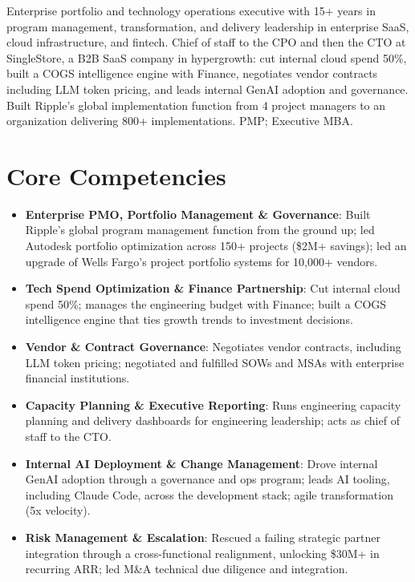 \documentclass[11pt,letterpaper,sans]{moderncv}
\begin{document}
\makecvtitle


\vspace{6pt}
\small{Enterprise portfolio and technology operations executive with 15+ years in program management, transformation, and delivery leadership in enterprise SaaS, cloud infrastructure, and fintech. Chief of staff to the CPO and then the CTO at SingleStore, a B2B SaaS company in hypergrowth: cut internal cloud spend 50\%, built a COGS intelligence engine with Finance, negotiates vendor contracts including LLM token pricing, and leads internal GenAI adoption and governance. Built Ripple's global implementation function from 4 project managers to an organization delivering 800+ implementations. PMP; Executive MBA.}


\section{Core Competencies}
\vspace{1pt}
\begin{itemize}

\item \textbf{Enterprise PMO, Portfolio Management \& Governance}: Built Ripple's global program management function from the ground up; led Autodesk portfolio optimization across 150+ projects (\$2M+ savings); led an upgrade of Wells Fargo's project portfolio systems for 10,000+ vendors.

\item \textbf{Tech Spend Optimization \& Finance Partnership}: Cut internal cloud spend 50\%; manages the engineering budget with Finance; built a COGS intelligence engine that ties growth trends to investment decisions.

\item \textbf{Vendor \& Contract Governance}: Negotiates vendor contracts, including LLM token pricing; negotiated and fulfilled SOWs and MSAs with enterprise financial institutions.

\item \textbf{Capacity Planning \& Executive Reporting}: Runs engineering capacity planning and delivery dashboards for engineering leadership; acts as chief of staff to the CTO.

\item \textbf{Internal AI Deployment \& Change Management}: Drove internal GenAI adoption through a governance and ops program; leads AI tooling, including Claude Code, across the development stack; agile transformation (5x velocity).

\item \textbf{Risk Management \& Escalation}: Rescued a failing strategic partner integration through a cross-functional realignment, unlocking \$30M+ in recurring ARR; led M\&A technical due diligence and integration.

\end{itemize}
\end{document}
